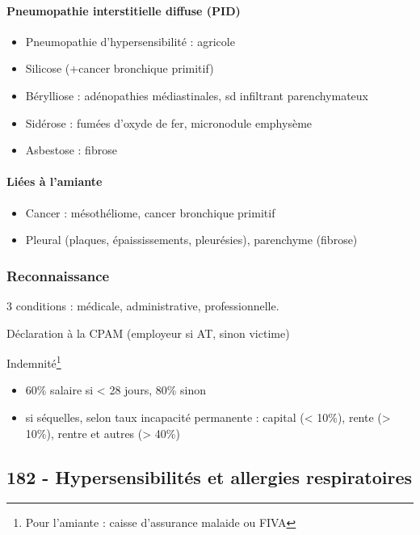 \documentclass[11pt]{article}
\begin{document}
\paragraph{Pneumopathie interstitielle diffuse (PID)}
\label{sec:orgf547eb3}

\begin{itemize}
\item Pneumopathie d'hypersensibilité : agricole
\item Silicose (+cancer bronchique primitif)
\item Bérylliose : adénopathies médiastinales, sd infiltrant parenchymateux
\item Sidérose : fumées d'oxyde de fer, micronodule \textpm{} emphysème
\item Asbestose : fibrose
\end{itemize}

\paragraph{Liées à l'amiante}
\label{sec:orgb1980ee}

\begin{itemize}
\item Cancer : mésothéliome, cancer bronchique primitif
\item Pleural (plaques, épaississements, pleurésies), parenchyme (fibrose)
\end{itemize}

\subsubsection{Reconnaissance}
\label{sec:orgcc1c00e}
3 conditions : médicale, administrative, professionnelle. 

Déclaration à la CPAM (employeur si AT, sinon victime)

Indemnité\footnote{Pour l'amiante : caisse d'assurance malaide ou FIVA}

\begin{itemize}
\item 60\% salaire si < 28 jours, 80\% sinon
\item si séquelles, selon taux incapacité permanente : capital (< 10\%), rente
(> 10\%), rentre et autres (> 40\%)
\end{itemize}

\subsection{182 \textdagger{} - Hypersensibilités et allergies respiratoires}
\label{sec:org2374e79}
\label{sec:182_hypersensibilites_et_allergies_respiratoires}
\end{document}
